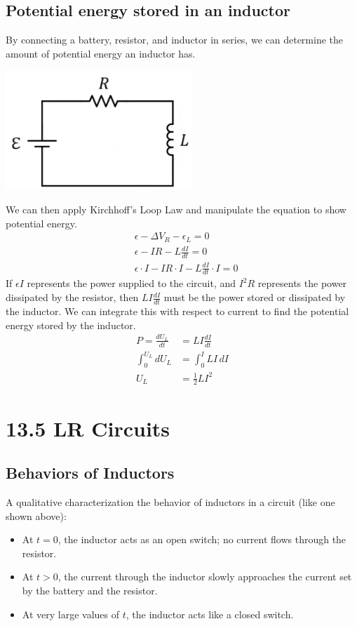 \documentclass[12pt, titlepage]{article}
\begin{document}
\subsection*{Potential energy stored in an inductor}

By connecting a battery, resistor, and inductor in series, we can determine the amount of potential energy an inductor has. 
\begin{center}
    \includegraphics*[height=4.5cm]{media/potentialenergy.png}
\end{center}
We can then apply Kirchhoff's Loop Law and manipulate the equation to show potential energy.
\begin{align*}
    & \epsilon - \Delta V_R - \epsilon_L=0 \\
    & \epsilon - IR - L \frac{dI}{dt} =0 \\
    & \epsilon \cdot I - IR \cdot I - L \frac{dI}{dt} \cdot I=0
\end{align*}
If $\epsilon I$ represents the power supplied to the circuit, and $I^2R$ represents the power dissipated by the resistor, then $LI\frac{dI}{dt}$ must be the power stored or dissipated by the inductor. We can integrate this with respect to current to find the potential energy stored by the inductor.
\begin{align*}
    P = \frac{dU_L}{dt} &= LI\frac{dI}{dt} \\
    \int_{0}^{U_L} dU_L & = \int_{0}^{I}LI \, dI \\
    U_L &= \boxed{\frac{1}{2}LI^2}
\end{align*}

\section*{13.5 LR Circuits}
\subsection*{Behaviors of Inductors}
A qualitative characterization the behavior of inductors in a circuit (like one shown above):
\begin{itemize}
    \item At $t=0$, the inductor acts as an open switch; no current flows through the resistor.
    \item At $t>0$, the current through the inductor slowly approaches the current set by the battery and the resistor.
    \item At very large values of $t$, the inductor acts like a closed switch.
\end{itemize}
\end{document}
